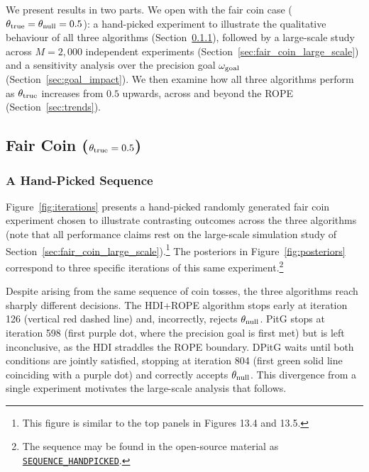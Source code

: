 We present results in two parts.
We open with the fair coin case ($\theta_{\rm true}=\theta_{\rm null}=0.5$):
a hand-picked experiment to illustrate the qualitative behaviour of all three algorithms
(Section~\ref{sec:fair_coin_sequence}), followed by a large-scale study across
$M=2{,}000$ independent experiments (Section~\ref{sec:fair_coin_large_scale}) and a
sensitivity analysis over the precision goal $\omega_{\rm goal}$
(Section~\ref{sec:goal_impact}).
We then examine how all three algorithms perform as $\theta_{\rm true}$ increases from
$0.5$ upwards, across and beyond the ROPE (Section~\ref{sec:trends}).

\subsection{Fair Coin ($\theta_{\rm true}=0.5$)}\label{sec:fair_coin}

\subsubsection{A Hand-Picked Sequence}\label{sec:fair_coin_sequence}

Figure~\ref{fig:iterations} presents a hand-picked randomly generated fair coin experiment chosen to
illustrate contrasting outcomes across the three algorithms (note that all performance claims
rest on the large-scale simulation study of
Section~\ref{sec:fair_coin_large_scale}).\footnote{This figure is similar to the top
panels in \cite{kruschke2015doing} Figures 13.4 and 13.5.}
The posteriors in Figure~\ref{fig:posteriors} correspond to three specific iterations
of this same experiment.\footnote{The sequence may be found in the open-source material
as \href{https://github.com/elzurdo/precision-goal/blob/main/py/utils_experiments.py\#L28}{\texttt{SEQUENCE\_HANDPICKED}}.}

Despite arising from the same sequence of coin tosses, the three algorithms reach
sharply different decisions.
The HDI+ROPE algorithm stops early at iteration 126 (vertical red dashed line) and, incorrectly,
rejects $\theta_{\rm null}$.
PitG stops at iteration 598 (first purple dot, where the precision goal is first met)
but is left inconclusive, as the HDI straddles the ROPE boundary.
DPitG waits until both conditions are jointly satisfied, stopping at iteration 804
(first green solid line coinciding with a purple dot) and correctly accepts
$\theta_{\rm null}$.
This divergence from a single experiment motivates the large-scale analysis that
follows.

